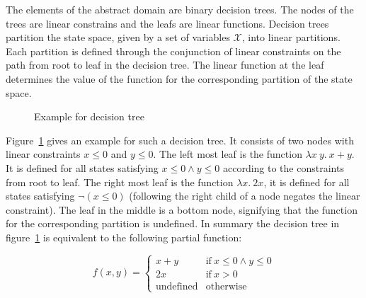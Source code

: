 \documentclass[11pt,a4paper,titlepage]{article}
\theoremstyle{definition}
\begin{document}
The elements of the abstract domain are binary decision trees. The nodes of the trees are linear constrains and the leafs are linear functions.
Decision trees partition the state space, given by a set of variables $\mathcal{X}$, into linear partitions. 
Each partition is defined through the conjunction of linear constraints on the path from root to leaf in the decision tree.
The linear function at the leaf determines the value of the function for the corresponding partition of the state space.\\

\begin{figure}
    \centering
    \caption{Example for decision tree}
    \label{fig:decision_tree_example}
\end{figure}

Figure~\ref{fig:decision_tree_example} gives an example for such a decision tree. 
It consists of two nodes with linear constraints $x \leq 0$ and $y \leq 0$. The left most leaf is the function $\lambda x \ y. \ x + y$. 
It is defined for all states satisfying $x \leq 0 \land y \leq 0$ according to the constraints from root to leaf. 
The right most leaf is the function $\lambda x.\ 2x$, it is defined for all states satisfying $\neg (x \leq 0)$ 
(following the right child of a node negates the linear constraint). The leaf in the middle is a bottom node, 
signifying that the function for the corresponding partition is undefined. 
In summary the decision tree in figure~\ref{fig:decision_tree_example} is equivalent to the following partial function:

\[
    f(x, y) = \begin{cases}
            x+y                   & \text{if} \ x \leq 0 \land y \leq 0 \\
            2x                   & \text{if} \ x > 0 \\
            \text{undefined}    & \text{otherwise}
        \end{cases}
\]
\end{document}
